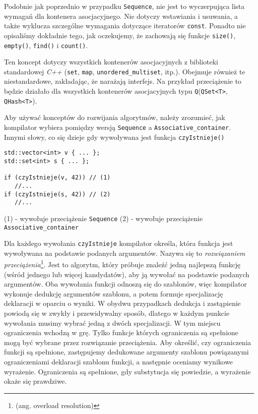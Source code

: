 \documentclass[11pt, a4paper]{article}
\begin{document}
Podobnie jak poprzednio w przypadku \verb#Sequence#, nie jest to wyczerpująca lista wymagań dla kontenera asocjacyjnego. Nie dotyczy wstawiania i usuwania, a także wyklucza szczególne wymagania dotyczące iteratorów \verb#const#. Ponadto nie opisaliśmy dokładnie tego, jak oczekujemy, że zachowają się funkcje \verb#size()#, \verb#empty()#, \verb#find()# i \verb#count()#.

Ten koncept dotyczy wszystkich kontenerów asocjacyjnych z biblioteki standardowej \emph{C++} (\verb#set#, \verb#map#, \verb#unordered_multiset#, itp.). Obejmuje również te niestandardowe, zakładając, że narażają interfejs. Na przykład przeciążenie to będzie działało dla wszystkich kontenerów asocjacyjnych typu \verb#Q#(\verb#QSet<T>#, \verb#QHash<T>#).

Aby używać konceptów do rozwijania algorytmów, należy zrozumieć, jak kompilator wybiera pomiędzy wersją \verb#Sequence# a \verb#Associative_container#. Innymi słowy, co się dzieje gdy wywoływana jest funkcja \verb#czyIstnieje()#

\begin{lstlisting}[frame=single]
std::vector<int> v { ... };
std::set<int> s { ... };

if (czyIstnieje(v, 42)) // (1)
   //...
if (czyIstnieje(s, 42)) // (2)
   //...
\end{lstlisting}

\noindent(1) - wywołuje przeciążenie \verb#Sequence#\newline
(2) - wywołuje przeciążenie \verb#Associative_container#\newline

\noindent Dla każdego wywołania \verb#czyIstnieje# kompilator określa, która funkcja jest wywoływana na podstawie podanych argumentów. Nazywa się to \emph{rozwiązaniem przeciążenia}\footnote{(ang. overload resolution)}. Jest to algorytm, który próbuje znaleźć jedną najlepszą funkcję (wśród jednego lub więcej kandydatów), aby ją wywołać na podstawie podanych argumentów. Oba wywołania funkcji odnoszą się do szablonów, więc kompilator wykonuje dedukcję argumentów szablonu, a potem formuje specjalizację deklaracji w oparciu o wyniki. W obydwu przypadkach dedukcja i zastąpienie powiodą się w zwykły i przewidywalny sposób, dlatego w każdym punkcie wywołania musimy wybrać jedną z dwóch specjalizacji. W tym miejscu ograniczenia wchodzą w grę. Tylko funkcje których ograniczenia są spełnione mogą być wybrane przez rozwiązanie przeciążenia. Aby określić, czy ograniczenia funkcji są spełnione, zastępujemy dedukowane argumenty szablonu powiązanymi ograniczeniami deklaracji szablonu funkcji, a następnie oceniamy wynikowe wyrażenie. Ograniczenia są spełnione, gdy substytucja się powiedzie, a wyrażenie okaże się prawdziwe.
\end{document}
